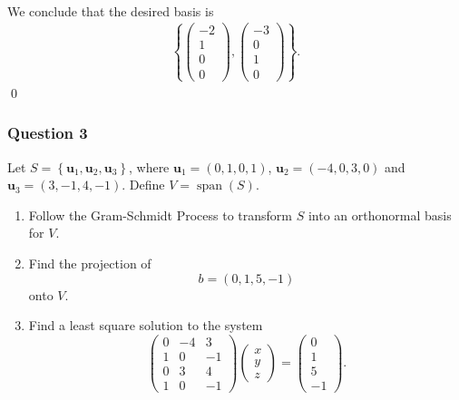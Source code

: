 \documentclass[12pt]{article}
\begin{document}
\begin{enumerate}[label=\textbf{(\alph*)}]
\begin{enumerate}[label=\textbf{(\roman*)}]
\begin{align*}
 \end{align*}
 We conclude that the desired basis is \begin{align*}
     \left\{\begin{pmatrix}
         -2\\1\\0\\0
     \end{pmatrix},\begin{pmatrix}
         -3\\0\\1\\0
     \end{pmatrix}\right\}.
 \end{align*}\qed 
        \end{enumerate}
\end{enumerate}
\subsubsection*{Question 3}
Let $S=\left\{\mathbf{u}_1,\mathbf{u}_2,\mathbf{u}_3\right\}$, where $\mathbf{u}_1=\left(0,1,0,1\right)$, $\mathbf{u}_2=\left(-4,0,3,0\right)$ and $\mathbf{u}_3=\left(3,-1,4,-1\right)$.
\newline Define $V=\operatorname{span}\left(S\right)$.
\begin{enumerate}[label=\textbf{(\alph*)}]
\itemsep 0em
    \item Follow the Gram-Schmidt Process to transform \( S \) into an orthonormal basis for \( V \). 
    \item Find the projection of 
    \[
    b = (0, 1, 5, -1)
    \]
    onto \( V \). 
    \item Find a least square solution to the system
    \[
    \begin{pmatrix}
    0 & -4 & 3 \\
    1 &  0 & -1 \\
    0 &  3 &  4 \\
    1 &  0 & -1
    \end{pmatrix}
    \begin{pmatrix}
    x \\ y \\ z
    \end{pmatrix}
    =
    \begin{pmatrix}
    0 \\ 1 \\ 5 \\ -1
    \end{pmatrix}.
    \]
\end{enumerate}
\end{document}
